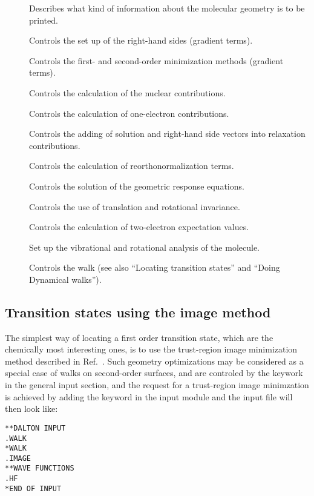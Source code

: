\begin{description}
\item[] Describes what kind  of information about the
molecular geometry is to be printed. 
\item[] Controls the set up of the right-hand sides
(gradient terms).
\item[] Controls the first- and second-order
minimization methods
(gradient terms).
\item[] Controls the calculation of the nuclear contributions.
\item[] Controls the calculation of one-electron contributions.
\item[] Controls the adding of solution and right-hand side vectors
into relaxation contributions.
\item[] Controls the calculation of reorthonormalization terms.
\item[] Controls the solution of the geometric response equations.
\item[] Controls the use of translation and rotational invariance.
\item[] Controls the calculation of two-electron
expectation values.
\item[] Set up the vibrational and rotational analysis of the
molecule.
\item[] Controls the walk (see also ``Locating transition
states'' and ``Doing Dynamical walks'').
\end{description}

\subsection{Transition states using the image method} 
\label{sec:image}

\begin{center}
\end{center}

The simplest way of locating a first order transition state, which are the
chemically most interesting ones, is to use the trust-region
image
minimization method described in Ref.~\cite{thcpl182}. Such geometry
optimizations  may be considered as a special case of walks on
second-order surfaces, and are controled by the keywork  in
the general input section, and the request for a trust-region image
minimzation is achieved  by adding the keyword  in the
 input module and the input file will then
look like:
\begin{verbatim}
**DALTON INPUT
.WALK
*WALK
.IMAGE
**WAVE FUNCTIONS
.HF
*END OF INPUT
\end{verbatim}


